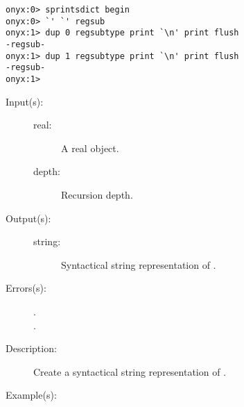 \begin{description}
\begin{description}
\begin{verbatim}
onyx:0> sprintsdict begin
onyx:0> `' `' regsub
onyx:1> dup 0 regsubtype print `\n' print flush
-regsub-
onyx:1> dup 1 regsubtype print `\n' print flush
-regsub-
onyx:1>
		\end{verbatim}
	\end{description}
\label{sprintsdict:realtype}
\item[{\onyxop{real depth}{realtype}{string}}: ]
	\begin{description}\item[]
	\item[Input(s): ]
		\begin{description}\item[]
		\item[real: ]
			A real object.
		\item[depth: ]
			Recursion depth.
		\end{description}
	\item[Output(s): ]
		\begin{description}\item[]
		\item[string: ]
			Syntactical string representation of .
		\end{description}
	\item[Errors(s): ]
		\begin{description}\item[]
		\item[.]
		\item[.]
		\end{description}
	\item[Description: ]
		Create a syntactical string representation of .
	\item[Example(s): ]\begin{verbatim}


\end{verbatim}
\end{description}
\end{description}
